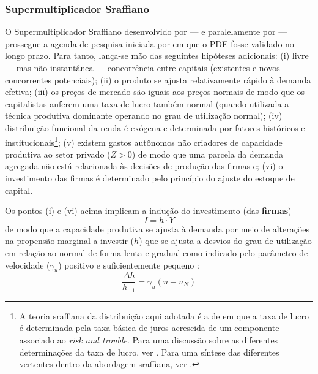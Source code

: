 \subsubsection{Supermultiplicador Sraffiano}\label{SecSuper}

O Supermultiplicador Sraffiano desenvolvido por \textcite{serrano_sraffian_1995} --- e paralelamente por \textcite{bortis_institutions_1996} --- prossegue a agenda de pesquisa iniciada por \textcite{garegnani_problem_2015} em que o PDE fosse validado no longo prazo. 
Para tanto, lança-se mão das seguintes hipóteses adicionais: 
	(i) livre --- mas não instantânea --- concorrência entre capitais (existentes e novos concorrentes potenciais);
	(ii) o produto se ajusta relativamente rápido à demanda efetiva;
	(iii) os preços de mercado são iguais aos preços normais de modo que os capitalistas auferem uma taxa de lucro também normal (quando utilizada a técnica produtiva dominante operando no grau de utilização normal);
	(iv) distribuição funcional da renda é exógena e determinada por fatores históricos e institucionais\footnote{
		A teoria sraffiana da distribuição aqui adotada é a de \textcite{pivetti_essay_1992} em que a taxa de lucro é determinada pela taxa básica de juros acrescida de um componente associado ao \textit{risk and trouble}.
		Para uma discussão sobre as diferentes determinações da taxa de lucro, ver \textcite{serrano_teoria_1988}.
		Para uma síntese das diferentes vertentes dentro da abordagem sraffiana, ver \textcite{aspromourgos_sraffian_2004}.
	};
	(v) existem gastos autônomos não criadores de capacidade produtiva ao setor privado ($Z>0$) de modo que uma parcela da demanda agregada não está relacionada às decisões de produção das firmas e;
	(vi) o investimento das firmas é determinado pelo princípio do ajuste do estoque de capital.

Os pontos (i) e (vi) acima implicam a indução do investimento (das \textbf{firmas}) 
$$
I = h\cdot Y
$$
de modo que a capacidade produtiva se ajusta à demanda por meio de alterações na propensão marginal a investir ($h$) que se ajusta a desvios do grau de utilização em relação ao normal de forma lenta e gradual como indicado pelo parâmetro de velocidade ($\gamma_u$) positivo e suficientemente pequeno \cite[p.~271]{freitas_growth_2015}:
$$
\frac{\Delta h}{h_{-1}} = \gamma_u (u - u_N)
$$

